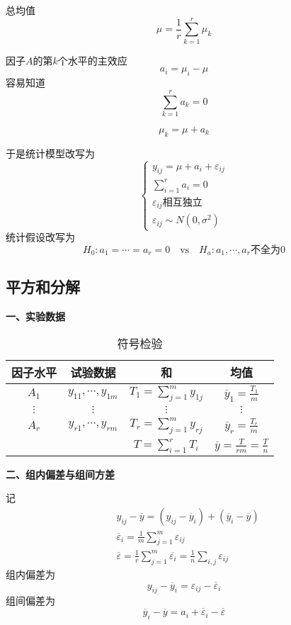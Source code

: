 \documentclass[lang = cn, scheme = chinese, thmcnt = section]{elegantbook}
\newcommand{\dis}{\displaystyle}
\begin{document}
总均值
$$
\mu=\frac{1}{r}\sum_{k=1}^{r}{\mu_k}
$$

因子$A$的第$k$个水平的主效应
$$
a_i=\mu_i-\mu
$$
容易知道
$$
\sum_{k=1}^{r}{a_k}=0
$$

$$
\mu_k=\mu+a_k
$$

于是统计模型改写为
$$
\begin{cases}
	y_{ij}=\mu+a_i+\varepsilon_{ij}\\
	\dis\sum_{i=1}^{r}{a_i}=0\\
	\varepsilon_{ij}\text{相互独立}\\
	\varepsilon_{ij}\sim N(0,\sigma^2)
\end{cases}
$$
统计假设改写为
$$
H_0:a_1=\cdots=a_r=0
\quad \mathrm{vs} \quad 
H_a:a_1,\cdots,a_r\text{不全为}0
$$

\subsection{平方和分解}

\textbf{一、实验数据}

\begin{table}[H]
	\centering
	\caption{符号检验}
	\begin{tabular}{|c|c|c|c|}
		\hline
		因子水平 & 试验数据 & 和 & 均值 \\ \hline
		$A_1$ & $y_{11},\cdots,y_{1m}$ & $\dis T_1=\sum_{j=1}^{m}{y_{1j}}$ & $\overline{y}_1=\frac{T_1}{m}$ \\ \hline
		$\vdots$ & $\vdots$ & $\vdots$ & $\vdots$ \\ \hline
		$A_r$ & $y_{r1},\cdots,y_{rm}$ & $\dis T_r=\sum_{j=1}^{m}{y_{rj}}$ & $\overline{y}_r=\frac{T_r}{m}$ \\ \hline
		& & $\dis T=\sum_{i=1}^{r}{T_i}$ & $\overline{y}=\frac{T}{rm}=\frac{T}{n}$ \\ \hline
	\end{tabular}
\end{table}

\textbf{二、组内偏差与组间方差}

记
\begin{align*}
	& y_{ij}-\overline{y}=(y_{ij}-\overline{y}_{i})+(\overline{y}_{i}-\overline{y})\\
	& \overline{\varepsilon}_i=\frac{1}{m}\sum_{j=1}^{m}{\varepsilon_{ij}}\\
	& \overline{\varepsilon}=\frac{1}{r}\sum_{j=1}^{m}{\overline{\varepsilon_{i}}}=\frac{1}{n}\sum_{i,j}{\varepsilon_{ij}}
\end{align*}
组内偏差为
$$
y_{ij}-\overline{y}_i=\varepsilon_{ij}-\overline{\varepsilon}_i
$$
组间偏差为
$$
\overline{y}_i-\overline{y}=a_i+\overline{\varepsilon}_i-\overline{\varepsilon}
$$
\end{document}
